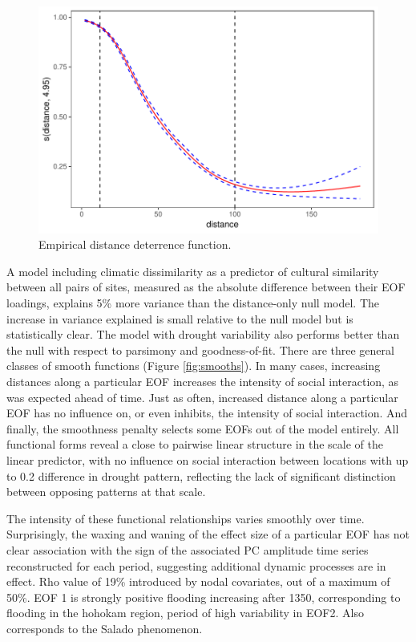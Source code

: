 \documentclass[10pt]{iopart}
\begin{document}
\begin{figure}[!htbp]
\centering
\includegraphics[width=\linewidth]{figures/distance_function.pdf}
\caption{Empirical distance deterrence function.}
\label{fig:distance}
\end{figure}

A model including climatic dissimilarity as a predictor of cultural similarity between all pairs of sites, measured as the absolute difference between their EOF loadings, explains 5\% more variance than the distance-only null model. The increase in variance explained is small relative to the null model but is statistically clear. The model with drought variability also performs better than the null with respect to parsimony and goodness-of-fit. There are three general classes of smooth functions (Figure \ref{fig:smooths}). In many cases, increasing distances along a particular EOF increases the intensity of social interaction, as was expected ahead of time. Just as often, increased distance along a particular EOF has no influence on, or even inhibits, the intensity of social interaction. And finally, the smoothness penalty selects some EOFs out of the model entirely. All functional forms reveal a close to pairwise linear structure in the scale of the linear predictor, with no influence on social interaction between locations with up to 0.2 difference in drought pattern, reflecting the lack of significant distinction between opposing patterns at that scale. 

The intensity of these functional relationships varies smoothly over time. Surprisingly, the waxing and waning of the effect size of a particular EOF has not clear association with the sign of the associated PC amplitude time series reconstructed for each period, suggesting additional dynamic processes are in effect. Rho value of 19\% introduced by nodal covariates, out of a maximum of 50\%. EOF 1 is strongly positive flooding increasing after 1350, corresponding to flooding in the hohokam region, period of high variability in EOF2. Also corresponds to the Salado phenomenon.
\end{document}
